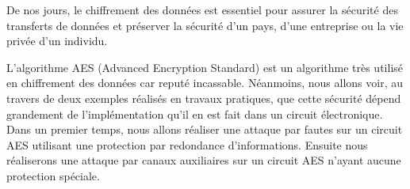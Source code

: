 De nos jours, le chiffrement des données est essentiel pour assurer la sécurité
des transferts de données et préserver la sécurité d'un pays, d'une entreprise
ou la vie privée d'un individu.

L'algorithme AES (Advanced Encryption Standard) est un algorithme très utilisé
en chiffrement des données car reputé incassable. Néanmoins, nous allons voir,
au travers de deux exemples réalisés en travaux pratiques, que cette sécurité
dépend grandement de l'implémentation qu'il en est fait dans un circuit
électronique.\\

Dans un premier temps, nous allons réaliser une attaque par fautes sur un
circuit AES utilisant une protection par redondance d'informations.
Ensuite nous réaliserons une attaque par canaux auxiliaires sur un circuit
AES n'ayant aucune protection spéciale.
